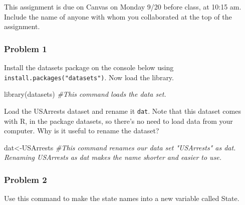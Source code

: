 \documentclass[
]{article}
\newenvironment{Shaded}{\begin{snugshade}}{\end{snugshade}}
\newcommand{\CommentTok}[1]{\textcolor[rgb]{0.56,0.35,0.01}{\textit{#1}}}
\newcommand{\FunctionTok}[1]{\textcolor[rgb]{0.00,0.00,0.00}{#1}}
\newcommand{\NormalTok}[1]{#1}
\newcommand{\OtherTok}[1]{\textcolor[rgb]{0.56,0.35,0.01}{#1}}
\newcommand{\SpecialCharTok}[1]{\textcolor[rgb]{0.00,0.00,0.00}{#1}}
\begin{document}
This assignment is due on Canvas on Monday 9/20 before class, at 10:15
am. Include the name of anyone with whom you collaborated at the top of
the assignment.

\hypertarget{problem-1}{%
\subsubsection{Problem 1}\label{problem-1}}

Install the datasets package on the console below using
\texttt{install.packages("datasets")}. Now load the library.

\begin{Shaded}
\begin{Highlighting}[]
\FunctionTok{library}\NormalTok{(datasets)}
\CommentTok{\#This command loads the data set. }
\end{Highlighting}
\end{Shaded}

Load the USArrests dataset and rename it \texttt{dat}. Note that this
dataset comes with R, in the package datasets, so there's no need to
load data from your computer. Why is it useful to rename the dataset?

\begin{Shaded}
\begin{Highlighting}[]
\NormalTok{dat}\OtherTok{\textless{}{-}}\NormalTok{USArrests}
\CommentTok{\#This command renames our data set "USArrests" as dat. Renaming USArrests as dat makes the name shorter and easier to use. }
\end{Highlighting}
\end{Shaded}

\hypertarget{problem-2}{%
\subsubsection{Problem 2}\label{problem-2}}

Use this command to make the state names into a new variable called
State.

\begin{Shaded}
\end{Shaded}
\end{document}
